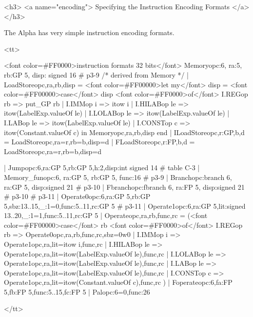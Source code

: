 <h3> <a name="encoding">
     Specifying the Instruction Encoding Formats </a></h3>

    The Alpha has very simple instruction encoding formats.

<tt>
\begin{SML}
   <font color=#FF0000>instruction formats 32 bits</font>
     Memory{opc:6, ra:5, rb:GP 5, disp: signed 16} #  p3-9 
      /* derived from Memory */ 
   | LoadStore{opc,ra,rb,disp} =
       <font color=#FF00000>let my</font> disp = 
           <font color=#FF00000>case</font> disp <font color=#FF0000>of</font>
             I.REGop rb => put_GP rb
           | I.IMMop i  => itow i
           | I.HILABop le => itow(LabelExp.valueOf le)
           | I.LOLABop le => itow(LabelExp.valueOf le)
           | I.LABop le => itow(LabelExp.valueOf le)
           | I.CONSTop c => itow(Constant.valueOf c)
       in  Memory{opc,ra,rb,disp}
       end
   | ILoadStore{opc,r:GP,b,d} = LoadStore{opc,ra=r,rb=b,disp=d}
   | FLoadStore{opc,r:FP,b,d} = LoadStore{opc,ra=r,rb=b,disp=d}

   | Jump{opc:6,ra:GP 5,rb:GP 5,h:2,disp:int signed 14}   #  table C-3 
   | Memory_fun{opc:6, ra:GP 5, rb:GP 5, func:16}     #  p3-9 
   | Branch{opc:branch 6, ra:GP 5, disp:signed 21}           #  p3-10 
   | Fbranch{opc:fbranch 6, ra:FP 5, disp:signed 21}          #  p3-10 
        #  p3-11 
   | Operate0{opc:6,ra:GP 5,rb:GP 5,sbz:13..15,_:1=0,func:5..11,rc:GP 5} 
        #  p3-11 
   | Operate1{opc:6,ra:GP 5,lit:signed 13..20,_:1=1,func:5..11,rc:GP 5} 
   | Operate{opc,ra,rb,func,rc} =
        (<font color=#FF00000>case</font> rb <font color=#FF0000>of</font>
          I.REGop rb => Operate0{opc,ra,rb,func,rc,sbz=0w0}
        | I.IMMop i  => Operate1{opc,ra,lit=itow i,func,rc}
        | I.HILABop le => Operate1{opc,ra,lit=itow(LabelExp.valueOf le),func,rc}
        | I.LOLABop le => Operate1{opc,ra,lit=itow(LabelExp.valueOf le),func,rc}
        | I.LABop le => Operate1{opc,ra,lit=itow(LabelExp.valueOf le),func,rc}
        | I.CONSTop c => Operate1{opc,ra,lit=itow(Constant.valueOf c),func,rc}
        )
   | Foperate{opc:6,fa:FP 5,fb:FP 5,func:5..15,fc:FP 5}
   | Pal{opc:6=0,func:26}
\end{SML}
</tt>

